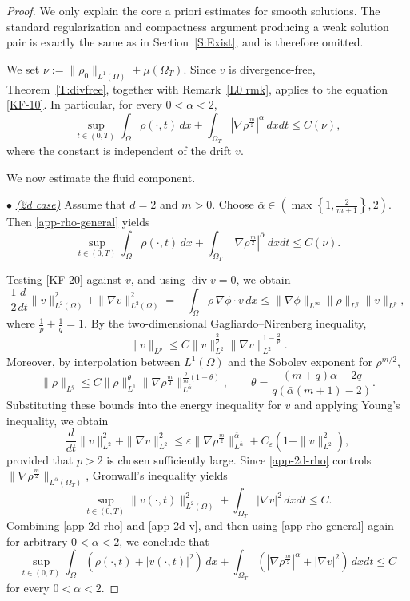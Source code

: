 \documentclass{amsart}
\numberwithin{equation}{section}
\begin{document}
\begin{proof}
We only explain the core a priori estimates for smooth solutions.  
The standard regularization and compactness argument producing a weak solution pair is exactly the same as in Section~\ref{S:Exist}, and is therefore omitted.

We set
$\nu:=\|\rho_0\|_{L^1(\Omega)}+\mu(\Omega_T)$.
Since $v$ is divergence-free, Theorem~\ref{T:divfree}, together with Remark~\ref{L0 rmk}, applies to the equation \eqref{KF-10}. In particular, for every $0<\alpha<2$,
\begin{equation}\label{app-rho-general}
\sup_{t\in(0,T)}\int_\Omega \rho(\cdot,t)\,dx
+
\int_{\Omega_T}\left|\nabla \rho^{\frac m2}\right|^\alpha\,dxdt
\le
C(\nu),
\end{equation}
where the constant is independent of the drift $v$.

We now estimate the fluid component.

\smallskip
\noindent
$\bullet$  \underline{\emph{(2d case)}} Assume that $d=2$ and $m>0$.
Choose
\(
\bar\alpha\in
\left(
\max\left\{1,\frac{2}{m+1}\right\},2
\right).
\)
Then \eqref{app-rho-general} yields
\begin{equation}\label{app-2d-rho}
\sup_{t\in(0,T)}\int_\Omega \rho(\cdot,t)\,dx
+
\int_{\Omega_T}\left|\nabla \rho^{\frac m2}\right|^{\bar\alpha}\,dxdt
\le
C(\nu).
\end{equation}

Testing \eqref{KF-20} against $v$, and using $\operatorname{div}v=0$, we obtain
\[
\frac12\frac{d}{dt}\|v\|_{L^2(\Omega)}^2+\|\nabla v\|_{L^2(\Omega)}^2
=
-\int_\Omega \rho\,\nabla\phi\cdot v\,dx
\le
\|\nabla\phi\|_{L^\infty}\|\rho\|_{L^q}\|v\|_{L^p},
\]
where
$\frac1p+\frac1q=1$.
By the two-dimensional Gagliardo--Nirenberg inequality,
\[
\|v\|_{L^p}
\le
C\|v\|_{L^2}^{\frac{2}{p}}\|\nabla v\|_{L^2}^{1-\frac{2}{p}}.
\]
Moreover, by interpolation between $L^1(\Omega)$ and the Sobolev exponent for $\rho^{m/2}$,
\[
\|\rho\|_{L^q}
\le
C
\|\rho\|_{L^1}^{\theta}
\|\nabla \rho^{\frac m2}\|_{L^{\bar\alpha}}^{\frac{2}{m}(1-\theta)},
\qquad
\theta=\frac{(m+q)\bar\alpha-2q}{q(\bar\alpha(m+1)-2)}.
\]
Substituting these bounds into the energy inequality for $v$ and applying Young's inequality, we obtain
\[
\frac{d}{dt}\|v\|_{L^2}^2+\|\nabla v\|_{L^2}^2
\le
\varepsilon \|\nabla \rho^{\frac m2}\|_{L^{\bar\alpha}}^{\bar\alpha}
+
C_\varepsilon\left(1+\|v\|_{L^2}^2\right),
\]
provided that $p>2$ is chosen sufficiently large. Since \eqref{app-2d-rho} controls
$\|\nabla \rho^{\frac m2}\|_{L^{\bar\alpha}(\Omega_T)}$,
Gronwall's inequality yields
\begin{equation}\label{app-2d-v}
\sup_{t\in(0,T)}\|v(\cdot,t)\|_{L^2(\Omega)}^2
+
\int_{\Omega_T}|\nabla v|^2\,dxdt
\le
C.
\end{equation}
Combining \eqref{app-2d-rho} and \eqref{app-2d-v}, and then using \eqref{app-rho-general} again for arbitrary $0<\alpha<2$, we conclude that
\[
\sup_{t\in(0,T)}\int_\Omega \left(\rho(\cdot,t)+|v(\cdot,t)|^2\right)\,dx
+
\int_{\Omega_T}\left(\left|\nabla \rho^{\frac m2}\right|^\alpha+|\nabla v|^2\right)\,dxdt
\le
C
\]
for every $0<\alpha<2$.


\end{proof}
\end{document}
